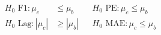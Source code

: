 \begin{align*}
    H_0 \text{ F1}: \mu_c &\leq \mu_b &&
    H_0 \text{ PE}: \mu_c \leq \mu_b\\
    H_0 \text{ Lag}: |\mu_c| &\geq |\mu_b|&&
    H_0 \text{ MAE}: \mu_c \leq \mu_b
\end{align*}
